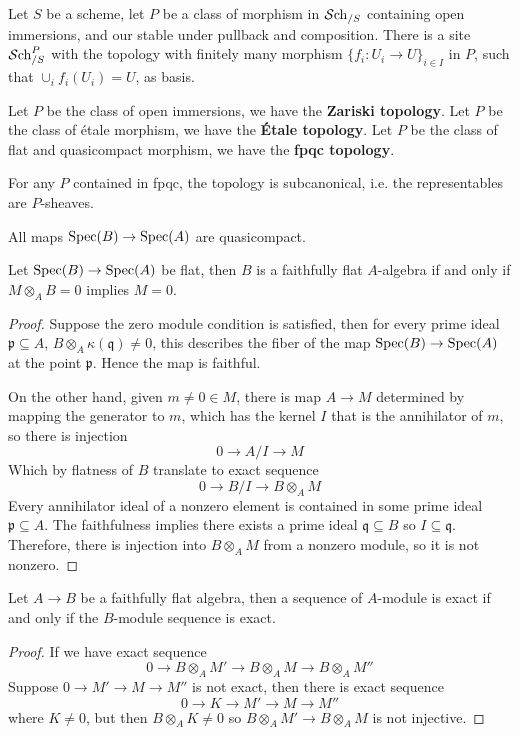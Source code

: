 \begin{definition}
    Let $S$ be a scheme, let $P$ be a class of morphism in $\mathcal{S}\mathrm{ch}_{/S}$ containing open immersions, and our stable under pullback and composition. 
    There is a site $\mathcal{S}\mathrm{ch}_{/S}^P$ with the topology with finitely many morphism $\{f_i: U_i\to U\}_{i\in I}$ in $P$, such that $\cup_i f_i(U_i)=U$, as basis. 

    Let $P$ be the class of open immersions, we have the \textbf{Zariski topology}. Let $P$ be the class of étale morphism, we have the \textbf{Étale topology}. 
    Let $P$ be the class of flat and quasicompact morphism, we have the \textbf{fpqc topology}.
\end{definition}

\begin{proposition}
For any $P$ contained in fpqc, the topology is subcanonical, i.e. the representables are $P$-sheaves.
\end{proposition}

\begin{lemma}
    All maps $\operatorname{\mathrm{Spec}}(B)\to \operatorname{\mathrm{Spec}}(A)$ are quasicompact.
\end{lemma}

\begin{lemma}
    Let $\operatorname{\mathrm{Spec}}(B)\to \operatorname{\mathrm{Spec}}(A)$ be flat, then $B$ is a faithfully flat $A$-algebra if and only if $M\otimes_A B=0$ implies $M=0$.
\end{lemma}
\begin{proof}
    Suppose the zero module condition is satisfied, then for every prime ideal $\mathfrak{p}\subseteq A$, $B\otimes_A \kappa(\mathfrak{q})\neq 0$, this describes the fiber of the map $\operatorname{\mathrm{Spec}}(B)\to \operatorname{\mathrm{Spec}}(A)$ at the point $\mathfrak{p}$. Hence the map is faithful.

    On the other hand, given $m\neq 0 \in M$, there is map $A\to M$ determined by mapping the generator to $m$, which has the kernel $I$ that is the annihilator of $m$, so there is injection
    \[
    0 \to A/I\to M
    \]Which by flatness of $B$ translate to exact sequence
    \[
    0 \to B/I \to B\otimes _A M
    \]
    Every annihilator ideal of a nonzero element is contained in some prime ideal $\mathfrak{p}\subseteq A$. The faithfulness implies there exists a prime ideal $\mathfrak{q}\subseteq B$ so $I \subseteq \mathfrak{q}$. Therefore, there is injection into $B\otimes_AM$ from a nonzero module, so it is not nonzero.
\end{proof}

\begin{lemma}
    Let $A\to B$ be a faithfully flat algebra, then a sequence of $A$-module is exact if and only if the $B$-module sequence is exact.
\end{lemma}

\begin{proof}
    If we have exact sequence
    \[
    0 \to B\otimes_A M'\to B\otimes_A M\to B\otimes_A M''
    \]Suppose $0\to M' \to M\to M'' $ is not exact, then there is exact sequence 
    \[
    0\to K \to M' \to M\to M''
    \]where $K\neq 0$, but then $B\otimes_A K\neq 0$ so $B\otimes_A M' \to B\otimes_AM$ is not injective.
\end{proof}